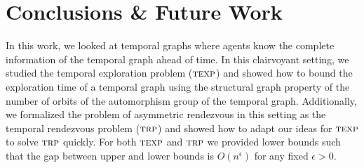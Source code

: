 \documentclass[10pt,a4paper]{article}
\newtheorem{theorem}{Theorem}[section]
\newcommand{\trp}{\textsc{trp}}
\newcommand{\texp}{\textsc{texp}}
\newcommand{\auttg}{\ensuremath{\text{Aut}(\mathcal{G})}}
\newcommand{\torb}{\ensuremath{\mathcal{G}/\auttg}}
\begin{document}
{%
%
}
\section{Conclusions \& Future Work}
In this work, we looked at temporal graphs where agents know the complete
information of the temporal graph ahead of time. In this clairvoyant setting,
we studied the temporal exploration problem ($\texp$) and showed how to bound
the exploration time of a temporal graph using the structural graph property of
the number of orbits of the automorphism group of the temporal graph.
Additionally, we formalized the problem of asymmetric rendezvous in this
setting as the temporal rendezvous problem ($\trp$) and showed how to adapt our
ideas for $\texp$ to solve $\trp$ quickly. For both $\texp$ and $\trp$ we
provided lower bounds such that the gap between upper and lower bounds is
$O(n^\epsilon)$ for any fixed $\epsilon > 0$. 
\end{document}

